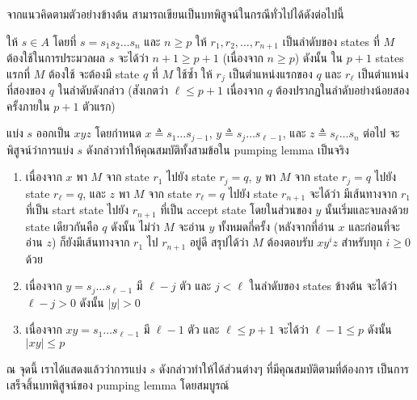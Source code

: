 \begin{theorem}
\begin{pf}
จากแนวคิดตามตัวอย่างข้างต้น สามารถเขียนเป็นบทพิสูจน์ในกรณีทั่วไปได้ดังต่อไปนี้

ให้ $s\in A$ โดยที่ $s=s_1s_2\ldots s_n$ และ $n\geq p$ \enskip ให้ $r_1,r_2,\ldots,r_{n+1}$ เป็นลำดับของ states ที่ $M$ ต้องใช้ในการประมวลผล $s$ \enskip จะได้ว่า $n+1\geq p+1$ (เนื่องจาก $n\geq p$) \enskip ดังนั้น ใน $p+1$ states แรกที่ $M$ ต้องใช้ จะต้องมี state $q$ ที่ $M$ ใช้ซ้ำ \enskip ให้ $r_j$ เป็นตำแหน่งแรกของ $q$ และ $r_\ell$ เป็นตำแหน่งที่สองของ $q$ ในลำดับดังกล่าว (สังเกตว่า $\ell\leq p+1$ เนื่องจาก $q$ ต้องปรากฏในลำดับอย่างน้อยสองครั้งภายใน $p+1$ ตัวแรก)

แบ่ง $s$ ออกเป็น $xyz$ โดยกำหนด $x\triangleq s_1\ldots s_{j-1}$, $y\triangleq s_j\ldots s_{\ell-1}$, และ $z\triangleq s_\ell\ldots s_n$ \enskip ต่อไป จะพิสูจน์ว่าการแบ่ง $s$ ดังกล่าวทำให้คุณสมบัติทั้งสามข้อใน pumping lemma เป็นจริง
\begin{enumerate}
\item เนื่องจาก $x$ พา $M$ จาก state $r_1$ ไปยัง state $r_j=q$, $y$ พา $M$ จาก state $r_j=q$ ไปยัง state $r_\ell=q$, และ $z$ พา $M$ จาก state $r_\ell=q$ ไปยัง state $r_{n+1}$ จะได้ว่า มีเส้นทางจาก $r_1$ ที่เป็น start state ไปยัง $r_{n+1}$ ที่เป็น accept state โดยในส่วนของ $y$ นั้นเริ่มและจบลงด้วย state เดียวกันคือ $q$ ดังนั้น ไม่ว่า $M$ จะอ่าน $y$ ทั้งหมดกี่ครั้ง (หลังจากที่อ่าน $x$ และก่อนที่จะอ่าน $z$) ก็ยังมีเส้นทางจาก $r_1$ ไป $r_{n+1}$ อยู่ดี \enskip สรุปได้ว่า $M$ ต้องตอบรับ $xy^iz$ สำหรับทุก $i\geq 0$ ด้วย
\item เนื่องจาก $y=s_j\ldots s_{\ell-1}$ มี $\ell-j$ ตัว และ $j<\ell$ ในลำดับของ states ข้างต้น จะได้ว่า $\ell-j>0$ ดังนั้น $|y|>0$
\item เนื่องจาก $xy=s_1\ldots s_{\ell-1}$ มี $\ell-1$ ตัว และ $\ell\leq p+1$ จะได้ว่า $\ell-1\leq p$ ดังนั้น $|xy|\leq p$
\end{enumerate}
ณ จุดนี้ เราได้แสดงแล้วว่าการแบ่ง $s$ ดังกล่าวทำให้ได้ส่วนต่างๆ ที่มีคุณสมบัติตามที่ต้องการ เป็นการเสร็จสิ้นบทพิสูจน์ของ pumping lemma โดยสมบูรณ์
\end{pf}
\end{theorem}

